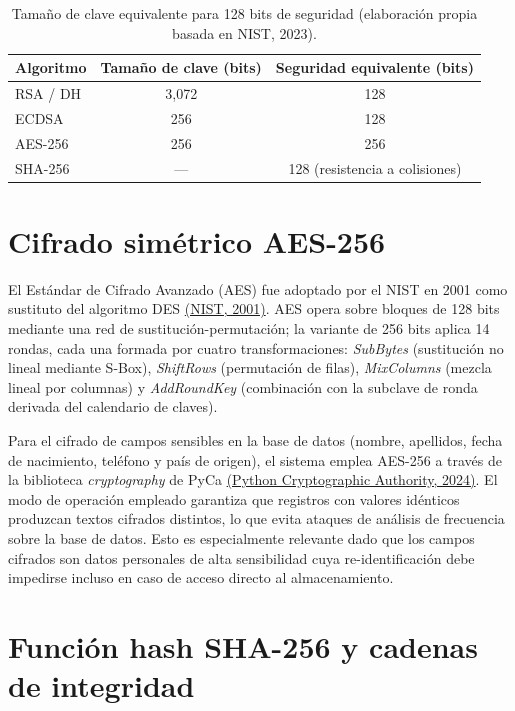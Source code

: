 \documentclass[10pt,letterpaper]{report}
\newcommand{\citeref}[2]{\hyperlink{ref:#1}{(#2)}}
\begin{document}
\begin{table}[h!]
\centering
\caption{Tamaño de clave equivalente para 128 bits de seguridad (elaboración propia basada en NIST, 2023).}
\label{tab:keysizes}
\begin{tabular}{lcc}
\toprule
\textbf{Algoritmo} & \textbf{Tamaño de clave (bits)} & \textbf{Seguridad equivalente (bits)}\\
\midrule
RSA / DH     & 3{,}072 & 128 \\
ECDSA        &     256 & 128 \\
AES-256      &     256 & 256 \\
SHA-256      &     --- & 128 (resistencia a colisiones) \\
\bottomrule
\end{tabular}
\end{table}

\section{Cifrado simétrico AES-256}

El Estándar de Cifrado Avanzado (AES) fue adoptado por el NIST en 2001 como sustituto del algoritmo DES \citeref{nist2001aes}{NIST, 2001}. AES opera sobre bloques de 128 bits mediante una red de sustitución-permutación; la variante de 256 bits aplica 14 rondas, cada una formada por cuatro transformaciones: \textit{SubBytes} (sustitución no lineal mediante S-Box), \textit{ShiftRows} (permutación de filas), \textit{MixColumns} (mezcla lineal por columnas) y \textit{AddRoundKey} (combinación con la subclave de ronda derivada del calendario de claves).

Para el cifrado de campos sensibles en la base de datos (nombre, apellidos, fecha de nacimiento, teléfono y país de origen), el sistema emplea AES-256 a través de la biblioteca \textit{cryptography} de PyCa \citeref{pyca2024}{Python Cryptographic Authority, 2024}. El modo de operación empleado garantiza que registros con valores idénticos produzcan textos cifrados distintos, lo que evita ataques de análisis de frecuencia sobre la base de datos. Esto es especialmente relevante dado que los campos cifrados son datos personales de alta sensibilidad cuya re-identificación debe impedirse incluso en caso de acceso directo al almacenamiento.

\section{Función hash SHA-256 y cadenas de integridad}
\end{document}
